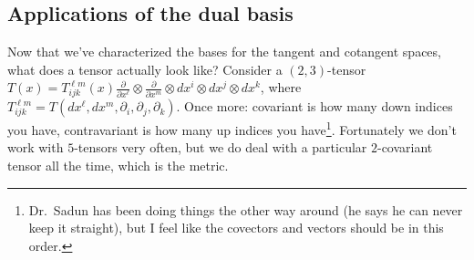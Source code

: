  \subsection{Applications of the dual basis}
 Now that we've characterized the bases for the tangent and cotangent spaces, what does a tensor actually look like? Consider a $(2,3)$-tensor $T(x)=T_{ijk}^{\ell m}(x)\frac{\partial }{\partial x^{\ell}}\otimes \frac{\partial }{\partial x^m}\otimes dx^i \otimes dx^j \otimes dx^k$, where $T_{ijk}^{\ell m}=T(dx^{\ell},dx^m,\partial _i ,\partial _j ,\partial _k)$. Once more: covariant is how many down indices you have, contravariant is how many up indices you have\footnote{Dr.\ Sadun has been doing things the other way around (he says he can never keep it straight), but I feel like the covectors and vectors should be in this order.}. Fortunately we don't work with $5$-tensors very often, but we do deal with a particular $2$-covariant tensor all the time, which is the metric. 

